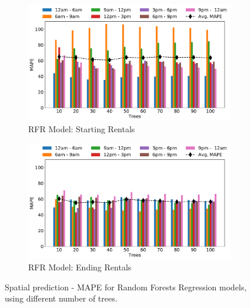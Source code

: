 \begin{figure}
    \begin{center}
         \begin{subfigure}{0.65\textwidth}
             \includegraphics[width=\columnwidth]{figures/spatial_analyses/MAE_hist_rfr_start_err_mean_perc.pdf}
             \caption{RFR Model: Starting Rentals
             \vspace{0.5cm}}
             \label{fig:8_5_rfr_start_MAPE}
         \end{subfigure}
         \begin{subfigure}{0.65\textwidth}
             \includegraphics[width=\columnwidth]{figures/spatial_analyses/MAE_hist_rfr_final_err_mean_perc.pdf}
             \caption{RFR Model: Ending Rentals}
             \label{fig:8_5_rfr_final_MAPE}
         \end{subfigure}         
 	\caption{Spatial prediction - MAPE for Random Forests Regression models, using different number of trees.}
    \label{fig:8_5_reg_MAPE_RF}
\end{center}
\end{figure}

